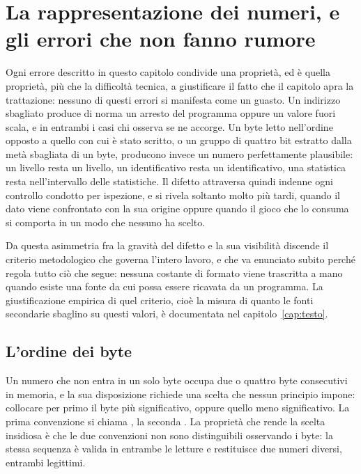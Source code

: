 
\chapter{La rappresentazione dei numeri, e gli errori che non fanno rumore}
\label{cap:bit}

Ogni errore descritto in questo capitolo condivide una proprietà, ed è quella proprietà, più che la difficoltà tecnica, a giustificare il fatto che il capitolo apra la trattazione: nessuno di questi errori si manifesta come un guasto. Un indirizzo sbagliato produce di norma un arresto del programma oppure un valore fuori scala, e in entrambi i casi chi osserva se ne accorge. Un byte letto nell'ordine opposto a quello con cui è stato scritto, o un gruppo di quattro bit estratto dalla metà sbagliata di un byte, producono invece un numero perfettamente plausibile: un livello resta un livello, un identificativo resta un identificativo, una statistica resta nell'intervallo delle statistiche. Il difetto attraversa quindi indenne ogni controllo condotto per ispezione, e si rivela soltanto molto più tardi, quando il dato viene confrontato con la sua origine oppure quando il gioco che lo consuma si comporta in un modo che nessuno ha scelto.

Da questa asimmetria fra la gravità del difetto e la sua visibilità discende il criterio metodologico che governa l'intero lavoro, e che va enunciato subito perché regola tutto ciò che segue: nessuna costante di formato viene trascritta a mano quando esiste una fonte da cui possa essere ricavata da un programma. La giustificazione empirica di quel criterio, cioè la misura di quanto le fonti secondarie sbaglino su questi valori, è documentata nel capitolo~\ref{cap:testo}.

\section{L'ordine dei byte}

Un numero che non entra in un solo byte occupa due o quattro byte consecutivi in memoria, e la sua disposizione richiede una scelta che nessun principio impone: collocare per primo il byte più significativo, oppure quello meno significativo. La prima convenzione si chiama , la seconda . La proprietà che rende la scelta insidiosa è che le due convenzioni non sono distinguibili osservando i byte: la stessa sequenza è valida in entrambe le letture e restituisce due numeri diversi, entrambi legittimi.

